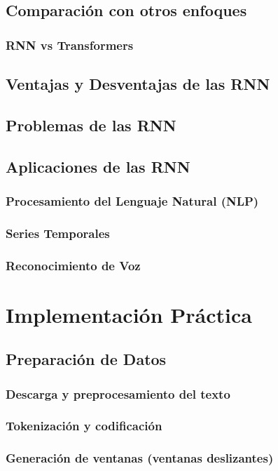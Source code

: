 \documentclass{article}
\begin{document}
\subsection{Comparación con otros enfoques}
\subsubsection{RNN vs Transformers}

\subsection{Ventajas y Desventajas de las RNN}
\subsection{Problemas de las RNN}
\subsection{Aplicaciones de las RNN}
\subsubsection{Procesamiento del Lenguaje Natural (NLP)}
\subsubsection{Series Temporales}
\subsubsection{Reconocimiento de Voz}

\newpage

\section{Implementación Práctica}
\subsection{Preparación de Datos}
\subsubsection{Descarga y preprocesamiento del texto}
\subsubsection{Tokenización y codificación}
\subsubsection{Generación de ventanas (ventanas deslizantes)}
\end{document}
